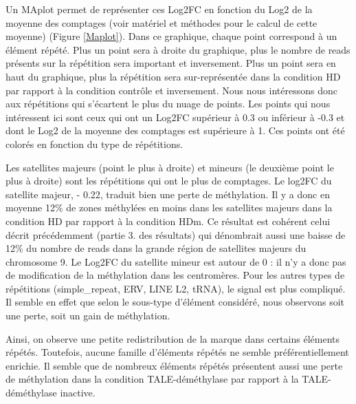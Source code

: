 \documentclass[a4paper,12pt,times]{report}
\begin{document}
\bigskip Un MAplot permet de représenter ces Log2FC en fonction du Log2 de la moyenne des comptages (voir matériel et méthodes pour le calcul de cette moyenne) (Figure \ref{Maplot}). Dans ce graphique, chaque point correspond à un élément répété. Plus un point sera à droite du graphique, plus le nombre de reads présents sur la répétition sera important et inversement. Plus un point sera en haut du graphique, plus la répétition sera sur-représentée dans la condition HD par rapport à la condition contrôle et inversement.
    Nous nous intéressons donc aux répétitions qui s'écartent le plus du nuage de points. 
     \newline Les points qui nous intéressent ici sont ceux qui ont un Log2FC supérieur à 0.3 ou inférieur à -0.3 et dont le Log2 de la moyenne des comptages est supérieure à 1.
     Ces points ont été colorés en fonction du type de répétitions.
   
 Les satellites majeurs (point le plus à droite) et mineurs (le deuxième point le plus à droite) sont les répétitions qui ont le plus de comptages.  Le log2FC du satellite majeur, - 0.22, traduit bien une perte de méthylation.
 Il y a donc en moyenne 12\% de zones méthylées en moins dans les satellites majeurs dans la condition HD par rapport à la condition HDm. Ce résultat est cohérent celui décrit précédemment (partie 3. des résultats) qui dénombrait aussi une baisse de 12\% du nombre de reads dans la grande région de satellites majeurs du chromosome 9.
 Le Log2FC du satellite mineur est autour de 0 : il n'y a donc pas de modification de la méthylation dans les centromères.
 Pour les autres types de répétitions (simple\_repeat, ERV, LINE L2, tRNA), le signal est plus compliqué. Il semble en effet que selon le sous-type d'élément considéré, nous observons soit une perte, soit un gain de méthylation.


\bigskip
Ainsi, on observe une petite redistribution de la marque dans certains éléments répétés. Toutefois, aucune famille d'éléments répétés ne semble préférentiellement enrichie.
Il semble que de nombreux éléments répétés présentent aussi une perte de méthylation dans la condition TALE-déméthylase par rapport à la TALE-déméthylase inactive.
\end{document}
